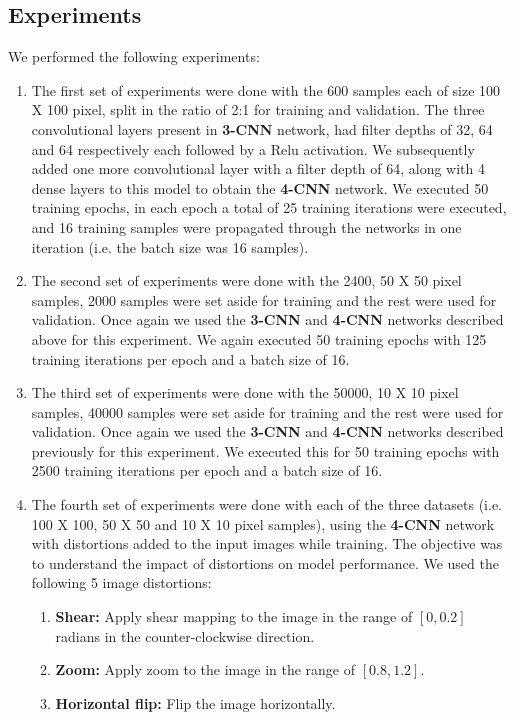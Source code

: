 \documentclass{sigkddExp}
\begin{document}
\subsection{Experiments}
We performed the following experiments:
\begin{enumerate}
\item The first set of experiments were done with the 600 samples each of size 100 X 100 pixel, split in the ratio of 2:1 for training and validation. The three convolutional layers present in \textbf{3-CNN} network, had filter depths of 32, 64 and 64 respectively each followed by a Relu activation. We subsequently added one more convolutional layer with a filter depth of 64, along with 4 dense layers to this model to obtain the \textbf{4-CNN} network. We executed 50 training epochs, in each epoch a total of 25 training iterations were executed, and 16 training samples were propagated through the networks in one iteration (i.e. the batch size was 16 samples).  
\item The second set of experiments were done with the 2400, 50 X 50 pixel samples, 2000 samples were set aside for training and the rest were used for validation. Once again we used the \textbf{3-CNN} and \textbf{4-CNN} networks described above for this experiment. We again executed 50 training epochs with 125 training iterations per epoch and a batch size of 16. 
\item The third set of experiments were done with the 50000, 10 X 10 pixel samples, 40000 samples were set aside for training and the rest were used for validation. Once again we used the \textbf{3-CNN} and \textbf{4-CNN} networks described previously for this experiment. We executed this for 50 training epochs with 2500 training iterations per epoch and a batch size of 16.
\item The fourth set of experiments were done with each of the three datasets (i.e. 100 X 100, 50 X 50 and 10 X 10 pixel samples), using the \textbf{4-CNN} network with distortions added to the input images while training. The objective was to understand the impact of distortions on model performance. We used the following 5 image distortions:
 \begin{enumerate}
 \item \textbf{Shear:} Apply shear mapping to the image in the range of $[0, 0.2]$ radians in the counter-clockwise direction.
 \item \textbf{Zoom:} Apply zoom to the image in the range of $[0.8, 1.2]$.
 \item \textbf{Horizontal flip: } Flip the image horizontally.

\end{enumerate}
\end{enumerate}
\end{document}
